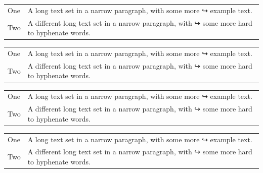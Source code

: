 \documentclass[a4paper]{article}
\begin{document}
\begin{table}
\begin{tabular}[t]{lp{3cm}}
One & A long text set in a narrow paragraph, with some more
↪ example text.\\
Two & A different long text set in a narrow paragraph, with
↪ some more hard to hyphenate words.
\end{tabular}%
\begin{tabular}[t]{l>{\raggedright\arraybackslash}p{3cm}}
One & A long text set in a narrow paragraph, with some more
↪ example text.\\
Two & A different long text set in a narrow paragraph, with
↪ some more hard to hyphenate words.
\end{tabular}%
\begin{tabular}[t]{l>{\RaggedRight}p{3cm}}
One & A long text set in a narrow paragraph, with some more
↪ example text.\\
Two & A different long text set in a narrow paragraph, with
↪ some more hard to hyphenate words.
\end{tabular}
\footnotesize
\begin{tabular}[t]{lp{3cm}}
One & A long text set in a narrow paragraph, with some more
↪ example text.\\
Two & A different long text set in a narrow paragraph, with
↪ some more hard to hyphenate words.
\end{tabular}
\end{table}
\end{document}
